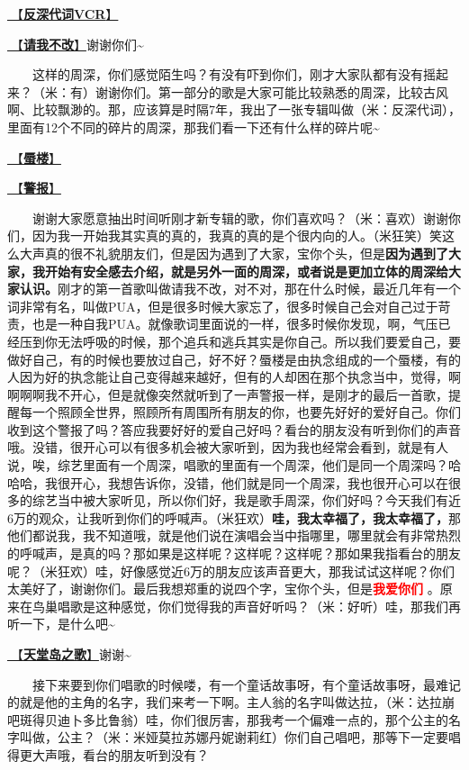 \documentclass[]{ctexbook}
\begin{document}
\hyperref[senself-vcr]{🎥【\textbf{反深代词VCR}】}

\hyperref[brave-heart]{🎵【\textbf{请我不改}】}谢谢你们\textasciitilde{}

  这样的周深，你们感觉陌生吗？有没有吓到你们，刚才大家队都有没有摇起来？（米：有）谢谢你们。第一部分的歌是大家可能比较熟悉的周深，比较古风啊、比较飘渺的。那，应该算是时隔7年，我出了一张专辑叫做（米：反深代词），里面有12个不同的碎片的周深，那我们看一下还有什么样的碎片呢\textasciitilde{}

\hyperref[mirage]{🎵【\textbf{蜃楼}】}

\hyperref[the-giver]{🎵【\textbf{警报}】}

  谢谢大家愿意抽出时间听刚才新专辑的歌，你们喜欢吗？（米：喜欢）谢谢你们，因为我一开始我其实真的真的，我真的真的是个很内向的人。（米狂笑）笑这么大声真的很不礼貌朋友们，但是因为遇到了大家，宝你个头，但是\textbf{因为遇到了大家，我开始有安全感去介绍，就是另外一面的周深，或者说是更加立体的周深给大家认识。}刚才的第一首歌叫做请我不改，对不对，那在什么时候，最近几年有一个词非常有名，叫做PUA，但是很多时候大家忘了，很多时候自己会对自己过于苛责，也是一种自我PUA。就像歌词里面说的一样，很多时候你发现，啊，气压已经压到你无法呼吸的时候，那个追兵和逃兵其实是你自己。所以我们要爱自己，要做好自己，有的时候也要放过自己，好不好？蜃楼是由执念组成的一个蜃楼，有的人因为好的执念能让自己变得越来越好，但有的人却困在那个执念当中，觉得，啊啊啊啊我不开心，但是就像突然就听到了一声警报一样，是刚才的最后一首歌，提醒每一个照顾全世界，照顾所有周围所有朋友的你，也要先好好的爱好自己。你们收到这个警报了吗？答应我要好好的爱自己好吗？看台的朋友没有听到你们的声音哦。没错，很开心可以有很多机会被大家听到，因为我也经常会看到，就是有人说，唉，综艺里面有一个周深，唱歌的里面有一个周深，他们是同一个周深吗？哈哈哈，我很开心，我想告诉你，没错，他们就是同一个周深，我也很开心可以在很多的综艺当中被大家听见，所以你们好，我是歌手周深，你们好吗？今天我们有近6万的观众，让我听到你们的呼喊声。（米狂欢）\textbf{哇，我太幸福了，我太幸福了，}那他们都说我，我不知道哦，就是他们说在演唱会当中指哪里，哪里就会有非常热烈的呼喊声，是真的吗？那如果是这样呢？这样呢？这样呢？那如果我指看台的朋友呢？（米狂欢）哇，好像感觉近6万的朋友应该声音更大，那我试试这样呢？你们太美好了，谢谢你们。最后我想郑重的说四个字，宝你个头，但是\textbf{\textcolor{red}{我爱你们} }。原来在鸟巢唱歌是这种感觉，你们觉得我的声音好听吗？（米：好听）哇，那我们再听一下，是什么吧\textasciitilde{}

\hyperref[haven-song]{🎵【\textbf{天堂岛之歌}】}谢谢\textasciitilde{}

  接下来要到你们唱歌的时候喽，有一个童话故事呀，有个童话故事呀，最难记的就是他的主角的名字，我们来考一下啊。主人翁的名字叫做达拉，（米：达拉崩吧斑得贝迪卜多比鲁翁）哇，你们很厉害，那我考一个偏难一点的，那个公主的名字叫做，公主？（米：米娅莫拉苏娜丹妮谢莉红）你们自己唱吧，那等下一定要唱得更大声哦，看台的朋友听到没有？
\end{document}
